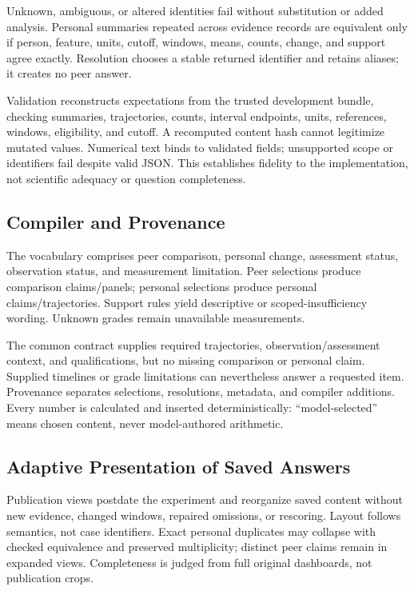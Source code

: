 Unknown, ambiguous, or altered identities fail without substitution or added analysis. Personal summaries repeated across evidence records are equivalent only if person, feature, units, cutoff, windows, means, counts, change, and support agree exactly. Resolution chooses a stable returned identifier and retains aliases; it creates no peer answer.

Validation reconstructs expectations from the trusted development bundle, checking summaries, trajectories, counts, interval endpoints, units, references, windows, eligibility, and cutoff. A recomputed content hash cannot legitimize mutated values. Numerical text binds to validated fields; unsupported scope or identifiers fail despite valid JSON. This establishes fidelity to the implementation, not scientific adequacy or question completeness.

\subsection{Compiler and Provenance}
The vocabulary comprises peer comparison, personal change, assessment status, observation status, and measurement limitation. Peer selections produce comparison claims/panels; personal selections produce personal claims/trajectories. Support rules yield descriptive or scoped-insufficiency wording. Unknown grades remain unavailable measurements.

The common contract supplies required trajectories, observation/assessment context, and qualifications, but no missing comparison or personal claim. Supplied timelines or grade limitations can nevertheless answer a requested item. Provenance separates selections, resolutions, metadata, and compiler additions. Every number is calculated and inserted deterministically: ``model-selected'' means chosen content, never model-authored arithmetic.

\subsection{Adaptive Presentation of Saved Answers}
Publication views postdate the experiment and reorganize saved content without new evidence, changed windows, repaired omissions, or rescoring. Layout follows semantics, not case identifiers. Exact personal duplicates may collapse with checked equivalence and preserved multiplicity; distinct peer claims remain in expanded views. Completeness is judged from full original dashboards, not publication crops.


